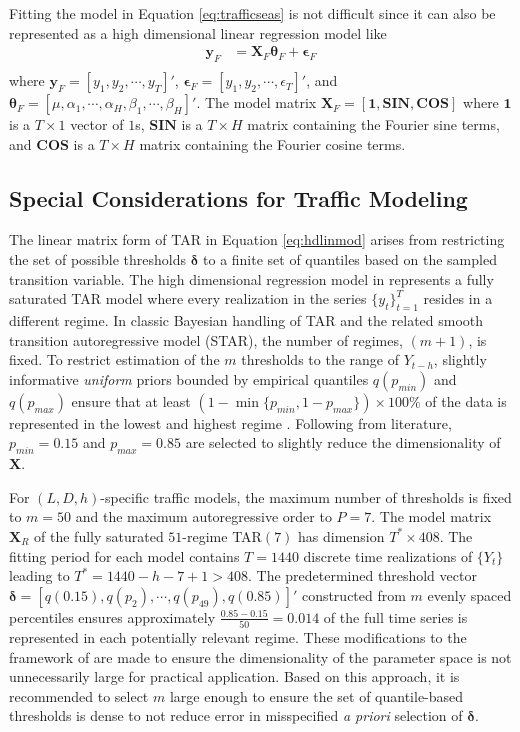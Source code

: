 Fitting the model in Equation \ref{eq:trafficseas} is not difficult since it can also be represented as a high dimensional linear regression model like
\begin{equation}
\label{eq:hdslinmod}
\begin{split}
\bm{y}_F &=\bm{X}_F\bm{\theta}_F+\bm{\epsilon}_F \\
\end{split}
\end{equation}
where $\bm{y}_F=[y_1,y_2,\cdots,y_T]'$, $\bm{\epsilon}_F=[y_1,y_2,\cdots,\epsilon_T]'$, and $\bm{\theta}_F=[\mu,\alpha_1,\cdots,\alpha_H,\beta_1,\cdots,\beta_H]'$. The model matrix  $\bm{X}_F=[\bm{1},\bm{SIN},\bm{COS}]$ where $\bm{1}$ is a $T\times 1$ vector of $1$s, $\bm{SIN}$ is a $T\times H$ matrix containing the Fourier sine terms, and $\bm{COS}$ is a $T\times H$ matrix containing the Fourier cosine terms.

\subsection{Special Considerations for Traffic Modeling}
The linear matrix form of TAR in Equation \ref{eq:hdlinmod} arises from restricting the set of possible thresholds  $\bm{\delta}$ to a finite set of quantiles based on the sampled transition variable. The high dimensional regression model in \cite{Chan2015,Chan2017} represents a fully saturated TAR model where every realization in the series $\{y_t\}_{t=1}^T$ resides in a different regime. In classic Bayesian handling of TAR and the related smooth transition autoregressive model (STAR), the number of regimes, $(m+1)$, is fixed. To restrict estimation of the $m$ thresholds to the range of $Y_{t-h}$, slightly informative \textit{uniform} priors bounded by empirical quantiles $q(p_{min})$ and $q(p_{max})$ ensure that at least $(1-\min\{p_{min},1-p_{max}\})\times 100\%$ of the data is represented in the lowest and highest regime \citep{Chen1995,Chen1998,Lubrano2000,Lopes2006}. Following from literature, $p_{min}=0.15$ and $p_{max}=0.85$ are selected to slightly reduce the dimensionality of $\bm{X}$.

For $(L,D,h)$-specific traffic models, the maximum number of thresholds is fixed to $m=50$ and the maximum autoregressive order to $P=7$. The model matrix $\bm{X}_R$ of the fully saturated $51$-regime TAR$(7)$ has dimension $T^*\times 408$. The fitting period for each model contains $T=1440$ discrete time realizations of $\{Y_t\}$ leading to $T^*=1440-h-7+1 > 408$. The predetermined threshold vector $\bm{\delta}=[q(0.15),q(p_2),\cdots,q(p_{49}),q(0.85)]'$ constructed from $m$ evenly spaced percentiles ensures approximately $\frac{0.85-0.15}{50}=0.014$ of the full time series is represented in each potentially relevant regime. These modifications to the framework of \cite{Chan2015,Chan2017} are made to ensure the dimensionality of the parameter space is not unnecessarily large for practical application. Based on this approach, it is recommended to select $m$ large enough to ensure the set of quantile-based thresholds is dense to not reduce error in misspecified \textit{a priori} selection of $\bm{\delta}$.

